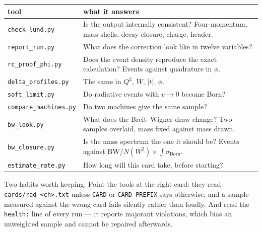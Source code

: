 \documentclass[11pt]{article}
\newcommand{\sborn}{\sigma_{\mathrm{Born}}}
\newcommand{\code}[1]{\texttt{#1}}
\begin{document}
\begin{center}
\small
\begin{tabular}{lp{10.2cm}}
\toprule
tool & what it answers \\
\midrule
\code{check\_lund.py}       & Is the output internally consistent? Four-momentum,
                              mass shells, decay closure, charge, header. \\
\code{report\_run.py}       & What does the correction look like in twelve
                              variables? \\
\code{rc\_proof\_phi.py}    & Does the event density reproduce the exact
                              calculation? Events against quadrature in $\phi$. \\
\code{delta\_profiles.py}   & The same in $Q^2$, $W$, $|t|$, $\phi$. \\
\code{soft\_limit.py}       & Do radiative events with $v\to0$ become Born? \\
\code{compare\_machines.py} & Do two machines give the same sample? \\
\code{bw\_look.py}          & What does the Breit--Wigner draw change? Two
                              samples overlaid, mass fixed against mass drawn. \\
\code{bw\_closure.py}       & Is the mass spectrum the one it should be?
                              Events against BW$/N(W^2)\times\int\sborn$. \\
\code{estimate\_rate.py}    & How long will this card take, before starting? \\
\bottomrule
\end{tabular}
\end{center}

Two habits worth keeping. Point the tools at the right card: they read
\code{cards/rad\_<ch>.txt} unless \code{CARD} or \code{CARD\_PREFIX} says
otherwise, and a sample measured against the wrong card fails silently rather
than loudly. And read the \code{health:} line of every run --- it reports
majorant violations, which bias an unweighted sample and cannot be repaired
afterwards.
\end{document}
